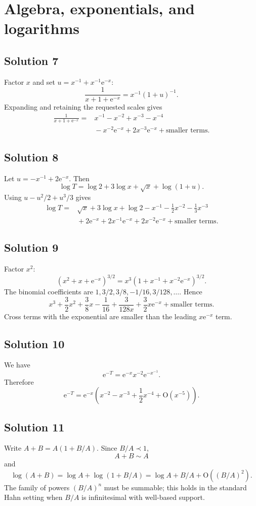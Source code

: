 \documentclass[11pt,openany]{book}
\theoremstyle{plain}
\theoremstyle{definition}
\theoremstyle{remark}
\newcommand{\bigO}{\mathrm{O}}
\newcommand{\e}{\mathrm{e}}
\begin{document}
\section{Algebra, exponentials, and logarithms}

\subsection*{Solution 7}
Factor $x$ and set $u=x^{-1}+x^{-1}\e^{-x}$:
\[
 \frac1{x+1+\e^{-x}}=x^{-1}(1+u)^{-1}.
\]
Expanding and retaining the requested scales gives
\begin{align*}
 \frac1{x+1+\e^{-x}}
 ={}&x^{-1}-x^{-2}+x^{-3}-x^{-4}\\
 &{}-x^{-2}\e^{-x}+2x^{-3}\e^{-x}
 +\text{smaller terms}.
\end{align*}

\subsection*{Solution 8}
Let $u=-x^{-1}+2\e^{-x}$. Then
\[
 \log T=\log2+3\log x+\sqrt{x}+\log(1+u).
\]
Using $u-u^2/2+u^3/3$ gives
\begin{align*}
 \log T={}&\sqrt{x}+3\log x+\log2
 -x^{-1}-\frac12x^{-2}-\frac13x^{-3}\\
 &{}+2\e^{-x}+2x^{-1}\e^{-x}
 +2x^{-2}\e^{-x}+\text{smaller terms}.
\end{align*}

\subsection*{Solution 9}
Factor $x^2$:
\[
 (x^2+x+\e^{-x})^{3/2}
 =x^3(1+x^{-1}+x^{-2}\e^{-x})^{3/2}.
\]
The binomial coefficients are $1,3/2,3/8,-1/16,3/128,\ldots$. Hence
\[
 x^3+\frac32x^2+\frac38x-\frac1{16}
 +\frac{3}{128x}
 +\frac32x\e^{-x}+\text{smaller terms}.
\]
Cross terms with the exponential are smaller than the leading $x\e^{-x}$ term.

\subsection*{Solution 10}
We have
\[
 \e^{-T}=\e^{-x}x^{-2}\e^{-x^{-1}}.
\]
Therefore
\[
 \e^{-T}=\e^{-x}\left(
 x^{-2}-x^{-3}+\frac12x^{-4}
 +\bigO(x^{-5})\right).
\]

\subsection*{Solution 11}
Write $A+B=A(1+B/A)$. Since $B/A\prec1$,
\[
 A+B\sim A
\]
and
\[
 \log(A+B)=\log A+\log(1+B/A)
 =\log A+B/A+\bigO((B/A)^2).
\]
The family of powers $(B/A)^n$ must be summable; this holds in the standard Hahn setting when $B/A$ is infinitesimal with well-based support.
\end{document}
